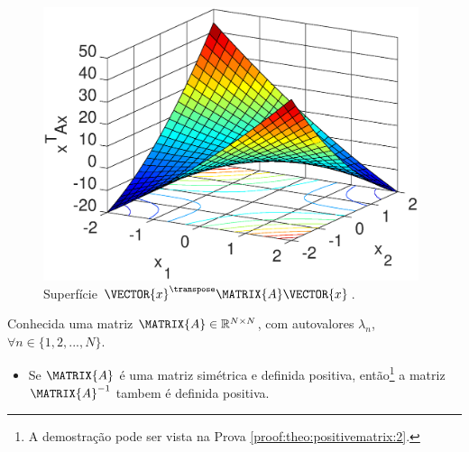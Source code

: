 \begin{minipage}{0.5\textwidth}
     \begin{figure}[H]
         \centering
         \includegraphics[width=0.98\textwidth]{chapters/teoria-basica/mfiles/positive-matrix/surfcexAx.eps}
         \caption{Superfície $\VECTOR{x}^{\transpose}\MATRIX{A}\VECTOR{x}$. }
         \label{fig:ex:positivematrix1}
     \end{figure}
\end{minipage}

\begin{theorem}\label{theo:positivematrix:2}
Conhecida uma matriz  $\MATRIX{A} \in \mathbb{R}^{N \times N}$, com  autovalores $\lambda_n$,
$\forall n \in \{1, 2, ..., N\}$.
\begin{itemize}
\item Se $\MATRIX{A}$ é uma matriz simétrica e definida positiva, então\footnote{A
demostração pode ser vista na Prova \ref{proof:theo:positivematrix:2}.}  
a matriz $\MATRIX{A}^{-1}$ tambem é definida positiva.
\end{itemize}
\end{theorem}

